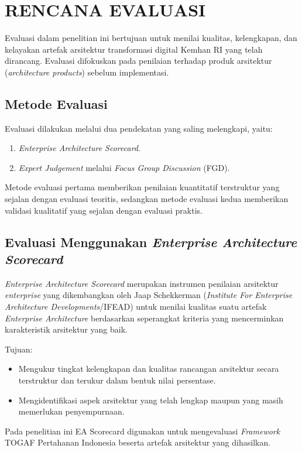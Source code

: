 \cleardoublepage
\chapter{RENCANA EVALUASI}
\label{chap:rencana-evaluasi}

Evaluasi dalam penelitian ini bertujuan untuk menilai kualitas, kelengkapan, dan kelayakan artefak arsitektur transformasi digital Kemhan RI yang telah dirancang.
Evaluasi difokuskan pada penilaian terhadap produk arsitektur (\textit{architecture products}) sebelum implementasi.

\section{Metode Evaluasi}
Evaluasi dilakukan melalui dua pendekatan yang saling melengkapi, yaitu:
\begin{enumerate}
  \item \textit{Enterprise Architecture Scorecard}\texttrademark{}.
  \item \textit{Expert Judgement} melalui \textit{Focus Group Discussion} (FGD).
\end{enumerate}
Metode evaluasi pertama memberikan penilaian kuantitatif terstruktur yang sejalan dengan evaluasi teoritis, sedangkan metode evaluasi kedua memberikan validasi kualitatif yang sejalan dengan evaluasi praktis.

\section{Evaluasi Menggunakan \textit{Enterprise Architecture Scorecard}\texttrademark}
\textit{Enterprise Architecture Scorecard}\texttrademark{} merupakan instrumen penilaian arsitektur \textit{enterprise} yang dikembangkan oleh Jaap Schekkerman (\textit{Institute For Enterprise Architecture Developments}/IFEAD) untuk menilai kualitas suatu artefak \textit{Enterprise Architecture} berdasarkan seperangkat kriteria yang mencerminkan karakteristik arsitektur yang baik.

Tujuan:
\begin{itemize}
  \item Mengukur tingkat kelengkapan dan kualitas rancangan arsitektur secara terstruktur dan terukur dalam bentuk nilai persentase.
  \item Mengidentifikasi aspek arsitektur yang telah lengkap maupun yang masih memerlukan penyempurnaan.
\end{itemize}
Pada penelitian ini EA Scorecard\texttrademark{} digunakan untuk mengevaluasi \textit{Framework} TOGAF Pertahanan Indonesia beserta artefak arsitektur yang dihasilkan.

